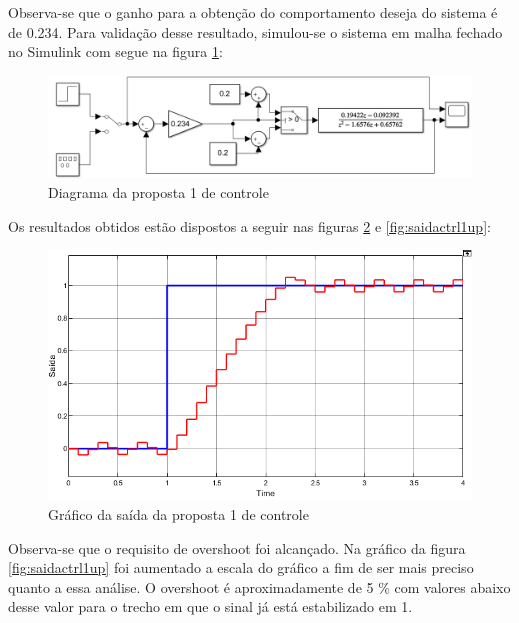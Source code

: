 \documentclass[a4paper,11pt]{article}
\begin{document}
Observa-se que o ganho para a obtenção do comportamento deseja do sistema é de 0.234. Para validação desse resultado, simulou-se o sistema em malha fechado no Simulink com segue na figura \ref{fig:controle1}:

\begin{figure}[H]
    \centering
    \includegraphics[width=\linewidth]{src/tex/img/controle_1.PNG}
    \caption{Diagrama da proposta 1 de controle}
    \label{fig:controle1}
\end{figure}

Os resultados obtidos estão dispostos a seguir nas figuras \ref{fig:saidactrl1} e \ref{fig:saidactrl1up}: 

\begin{figure}[H]
    \centering
    \includegraphics[width=\linewidth]{src/tex/img/saida_controle_1.png}
    \caption{Gráfico da saída da proposta 1 de controle}
    \label{fig:saidactrl1}
\end{figure}

Observa-se que o requisito de overshoot foi alcançado. Na gráfico da figura \ref{fig:saidactrl1up} foi aumentado a escala do gráfico a fim de ser mais preciso quanto a essa análise. O overshoot é aproximadamente de 5 \% com valores abaixo desse valor para o trecho em que o sinal já está estabilizado em 1.
\end{document}
